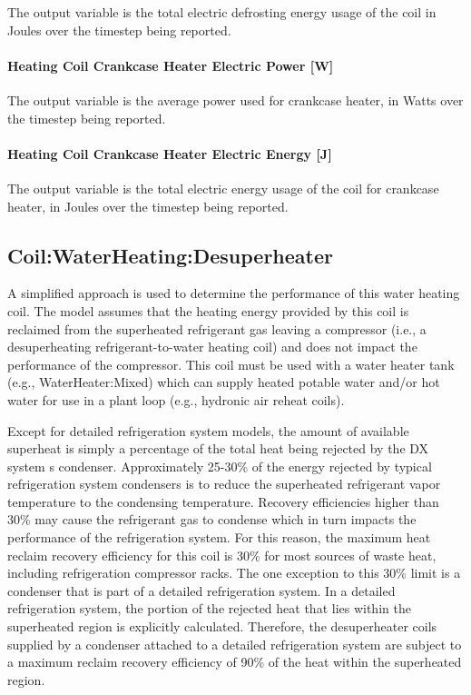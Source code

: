 The output variable is the total electric defrosting energy usage of the coil in Joules over the timestep being reported.

\paragraph{Heating Coil Crankcase Heater Electric Power {[}W{]}}\label{heating-coil-crankcase-heater-electric-power-w-2}

The output variable is the average power used for crankcase heater, in Watts over the timestep being reported.

\paragraph{Heating Coil Crankcase Heater Electric Energy {[}J{]}}\label{heating-coil-crankcase-heater-electric-energy-j-2}

The output variable is the total electric energy usage of the coil for crankcase heater, in Joules over the timestep being reported.

\subsection{Coil:WaterHeating:Desuperheater}\label{coilwaterheatingdesuperheater}

A simplified approach is used to determine the performance of this water heating coil. The model assumes that the heating energy provided by this coil is reclaimed from the superheated refrigerant gas leaving a compressor (i.e., a desuperheating refrigerant-to-water heating coil) and does not impact the performance of the compressor. This coil must be used with a water heater tank (e.g., WaterHeater:Mixed) which can supply heated potable water and/or hot water for use in a plant loop (e.g., hydronic air reheat coils).

Except for detailed refrigeration system models, the amount of available superheat is simply a percentage of the total heat being rejected by the DX system s condenser. Approximately 25-30\% of the energy rejected by typical refrigeration system condensers is to reduce the superheated refrigerant vapor temperature to the condensing temperature. Recovery efficiencies higher than 30\% may cause the refrigerant gas to condense which in turn impacts the performance of the refrigeration system. For this reason, the maximum heat reclaim recovery efficiency for this coil is 30\% for most sources of waste heat, including refrigeration compressor racks. The one exception to this 30\% limit is a condenser that is part of a detailed refrigeration system. In a detailed refrigeration system, the portion of the rejected heat that lies within the superheated region is explicitly calculated. Therefore, the desuperheater coils supplied by a condenser attached to a detailed refrigeration system are subject to a maximum reclaim recovery efficiency of 90\% of the heat within the superheated region.

